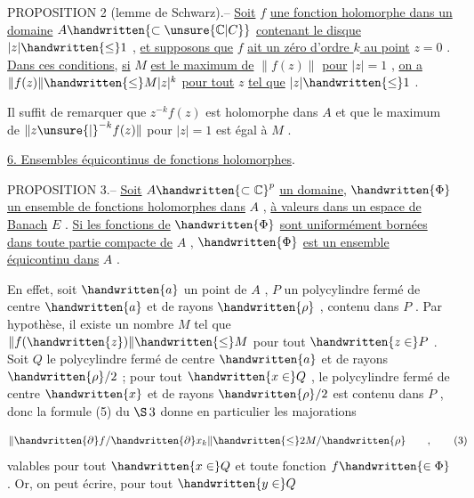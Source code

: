 PROPOSITION 2 (lemme de Schwarz).-- \uline{Soit} $f$ \uline{une fonction holomorphe dans un domaine} $A\handwritten{\subset\unsure{\mathbb C|C}}$ \uline{contenant le disque} $|z|\handwritten{\leq}1$ , \uline{et supposons que} $f$ \uline{ait un zéro d'ordre $k$ au point} $z=0$ . \uline{Dans ces conditions}, \uline{si} $M$ \uline{est le maximum de} $\|f(z)\|$ \uline{pour} $|z|=1$ , \uline{on a} $\|f(z)\|\handwritten{\leq}M|z|^k$ \uline{pour tout} $z$ \uline{tel que} $|z|\handwritten{\leq}1$ .

Il suffit de remarquer que $z^{-k}f(z)$ est holomorphe dans $A$ et que le maximum de $\|z\unsure{\vert}^{-k}f(z)\|$ pour $|z|=1$ est égal à $M$ .

\uline{6. Ensembles équicontinus de fonctions holomorphes}.

PROPOSITION 3.-- \uline{Soit} $A\handwritten{\subset\mathbb C}^p$ \uline{un domaine}, $\handwritten{\Phi}$ \uline{un ensemble de fonctions holomorphes dans} $A$ , \uline{à valeurs dans un espace de Banach} $E$ . \uline{Si les fonctions de} $\handwritten{\Phi}$ \uline{sont uniformément bornées dans toute partie compacte de} $A$ , $\handwritten{\Phi}$ \uline{est un ensemble équicontinu dans} $A$ .

En effet, soit $\handwritten{a}$ un point de $A$ , $P$ un polycylindre fermé de centre $\handwritten{a}$ et de rayons $\handwritten{\rho}$ , contenu dans $P$ . Par hypothèse, il existe un nombre $M$ tel que $\|f(\handwritten{z})\|\handwritten{\leq}M$ pour tout $\handwritten{z\in}P$ . Soit $Q$ le polycylindre fermé de centre $\handwritten{a}$ et de rayons $\handwritten{\rho}/2$ ; pour tout $\handwritten{x\in}Q$ , le polycylindre fermé de centre $\handwritten{x}$ et de rayons $\handwritten{\rho}/2$ est contenu dans $P$ , donc la formule (5) du $\S\,3$ donne en particulier les majorations

\[
\lVert\handwritten{\partial}f/\handwritten{\partial}x_k\rVert\handwritten{\leq}2M/\handwritten{\rho}\qquad ,\tag*{\makebox[0pt][r]{\makebox[\displaywidth][l]{(3)}}}
\]
valables pour tout $\handwritten{x\in}Q$ et toute fonction $f\handwritten{\in\Phi}$ . Or, on peut écrire, pour tout $\handwritten{y\in}Q$

